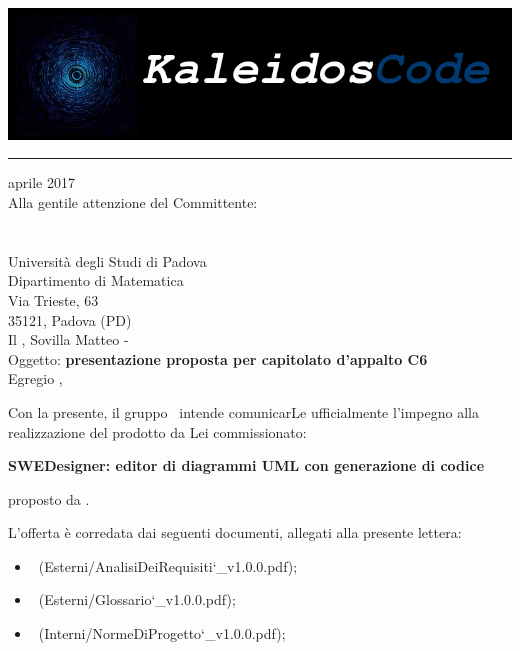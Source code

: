 \documentclass[a4paper,12pt]{article}
\author{KaleidosCode}
\date{01/04/2017}	%
\begin{document}
	\begin{titlepage}
		\includegraphics[scale=0.2]{../../../Immagini/KaleidosCodeLogo.png}
		\hrule
		\vspace{1.2cm}
		 aprile 2017\\
		\vspace{0.4cm}
		Alla gentile attenzione del Committente:\\
		\vardanega\\
		\cardin\\
		Università degli Studi di Padova\\
		Dipartimento di Matematica\\
		Via Trieste, 63\\
		35121, Padova (PD)\\
		\vspace{1.2cm}
		\flushleft Il \responsabilediprogetto, Sovilla Matteo - \kaleidoscode\\
		\vspace{0.4cm}
		Oggetto: \textbf{presentazione proposta per capitolato d'appalto C6}\\
		\vspace{1cm}
		Egregio \vardanega,\\
		\vspace{0.4cm}
		\par Con la presente, il gruppo \kaleidoscode\ intende comunicarLe ufficialmente l'impegno alla realizzazione
		del prodotto da Lei commissionato:
		\begin{center}
			\textbf{SWEDesigner: editor di diagrammi UML con generazione di codice} 
		\end{center}
		proposto da \proponente.
		\par L'offerta è corredata dai seguenti documenti, allegati alla presente lettera:
		\begin{itemize}
			\item \analisideirequisitiv\ (Esterni/AnalisiDeiRequisiti\char`_v1.0.0.pdf);
			\item \glossariov\ (Esterni/Glossario\char`_v1.0.0.pdf);
			\item \normediprogettov\ (Interni/NormeDiProgetto\char`_v1.0.0.pdf);

\end{itemize}
\end{titlepage}
\end{document}
